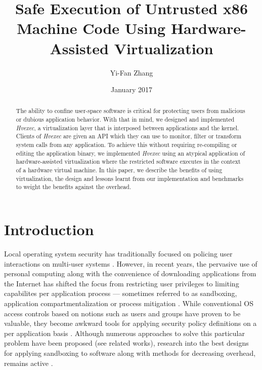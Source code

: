 \documentclass{article}
\title{Safe Execution of Untrusted x86 Machine Code Using Hardware-Assisted Virtualization}
\author{Yi-Fan Zhang}
\date{January 2017}
\newcommand{\PROJNAME}{\textit{Hvexec}}
\begin{document}
\maketitle

\begin{abstract}
The ability to confine user-space software is critical for protecting users from
malicious or dubious application behavior.
With that in mind, we designed and implemented \PROJNAME{}, a virtualization layer that is interposed between applications and the kernel. Clients of \PROJNAME{} are given an API which they can use to monitor, filter or transform system calls from any application. To achieve this without requiring re-compiling or editing the application binary, we implemented \PROJNAME{} using an atypical application of hardware-assisted virtualization
where the restricted software executes in the context of a hardware virtual machine.
In this paper, we describe the benefits of using virtualization, the design and lessons learnt from our implementation and benchmarks to 
weight the benefits against the overhead.
\end{abstract}

\section{Introduction}
Local operating system security has traditionally focused on policing user interactions on multi-user systems \cite{DesignImplFreeBSD}.
However, in recent years, the pervasive use of personal computing along with the convenience of downloading
applications from the Internet has shifted the focus from restricting user privileges to limiting capabilites per application process
— sometimes referred to as sandboxing, application compartmentalization or process mitigation \cite{DesignImplFreeBSD}.
While conventional OS access controls based on notions such as users and groups have proven to be valuable,
they become awkward tools for applying security policy definitions on a per application basis \cite{DesignImplFreeBSD}.
Although numerous approaches to solve this particular problem have been proposed (see related works),
research into the best designs for applying sandboxing to software along with methods for decreasing overhead, remains active \cite{Ayer2012,VCall2010,DesignImplFreeBSD}.
\end{document}

